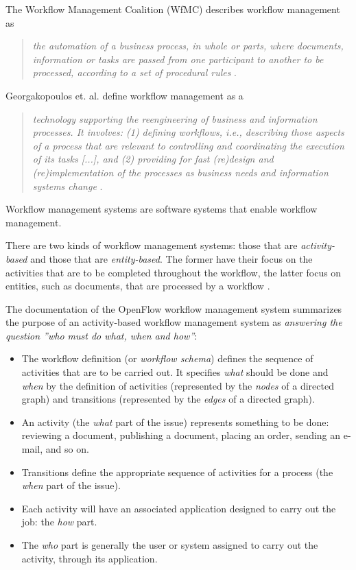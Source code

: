 The Workflow Management Coalition (WfMC) describes workflow management as

\begin{quote}
\emph{the automation of a business process, in whole or parts, where
documents, information or tasks are passed from one participant to another to
be processed, according to a set of procedural rules} \cite{RA01}.
\end{quote}

Georgakopoulos et. al. define workflow management as a

\begin{quote}
\emph{technology supporting the reengineering of business and information
processes. It involves: (1) defining \emph{workflows}, i.e., describing
those aspects of a process that are relevant to controlling and
coordinating the execution of its tasks [...], and (2) providing for fast
(re)design and (re)implementation of the processes as business needs and
information systems change} \cite{DG95}.
\end{quote}

Workflow management systems are software systems that enable workflow
management.

There are two kinds of workflow management systems: those that are
\emph{activity-based} and those that are \emph{entity-based}. The former have
their focus on the activities that are to be completed throughout the workflow,
the latter focus on entities, such as documents, that are processed by a
workflow \cite{FG02}.

The documentation of the OpenFlow workflow management system \cite{OPENFLOW}
summarizes the purpose of an activity-based workflow management system as
\emph{answering the question ''who must do what, when and how''}:

\begin{itemize}
\item The workflow definition (or \emph{workflow schema}) defines the sequence
      of activities that are to be carried out. It specifies \emph{what}
      should be done and \emph{when} by the definition of activities
      (represented by the \emph{nodes} of a directed graph) and transitions
      (represented by the \emph{edges} of a directed graph).

\item An activity (the \emph{what} part of the issue) represents
      something to be done: reviewing a document, publishing a document,
      placing an order, sending an e-mail, and so on.

\item Transitions define the appropriate sequence of activities for a
      process (the \emph{when} part of the issue).

\item Each activity will have an associated application designed to
      carry out the job: the \emph{how} part.

\item The \emph{who} part is generally the user or system assigned to carry
      out the activity, through its application.
\end{itemize}

